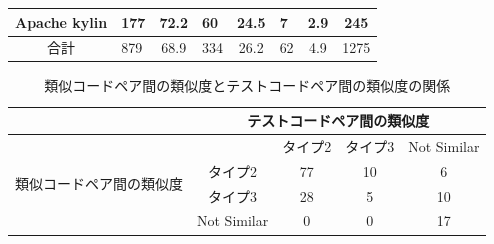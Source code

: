 \documentclass{fose2019}           %
\begin{document}
\begin{table}[]
\begin{tabular}{|c|p{2.5em}|c|p{4em}|c|p{3.5em}|c|c|c|}
{\scriptsize Apache kylin}             & {\scriptsize \hfil 177 \hfil}                & {\scriptsize 72.2}                &{\scriptsize \hfil 60 \hfil}                       & {\scriptsize 24.5}                     & {\scriptsize \hfil 7 \hfil}                      & {\scriptsize 2.9}                    & \multicolumn{2}{c|}{\scriptsize 245}  \\ \hline
{\scriptsize 合計}                      & {\scriptsize \hfil 879 \hfil}                & {\scriptsize 68.9}                & {\scriptsize \hfil 334 \hfil}                      & {\scriptsize 26.2}                     & {\scriptsize \hfil 62 \hfil}                     & {\scriptsize 4.9}                    & \multicolumn{2}{c|}{\scriptsize 1275} \\ \hline
\end{tabular}
\end{table}



\begin{table}[]
\centering
\caption{類似コードペア間の類似度とテストコードペア間の類似度の関係}
\label{table2}
\begin{tabular}{|c|c|c|c|c|}
\hline
                             & \multicolumn{4}{c|}{\scriptsize テストコードペア間の類似度}         \\ \hline
\multirow{4}{*}{\scriptsize 類似コードペア間の類似度} &             & \scriptsize タイプ2 & \scriptsize タイプ3 & \scriptsize Not Similar \\ \cline{2-5} 
                             & \scriptsize タイプ2 & \scriptsize 77          & \scriptsize 10     & \scriptsize 6     \\ \cline{2-5} 
                             &\scriptsize タイプ3       & \scriptsize 28           & \scriptsize 5    & \scriptsize 10    \\ \cline{2-5} 
                             & \scriptsize Not Similar       & \scriptsize 0           & \scriptsize 0    & \scriptsize 17     \\ \hline
\end{tabular}
\end{table}
\end{document}
